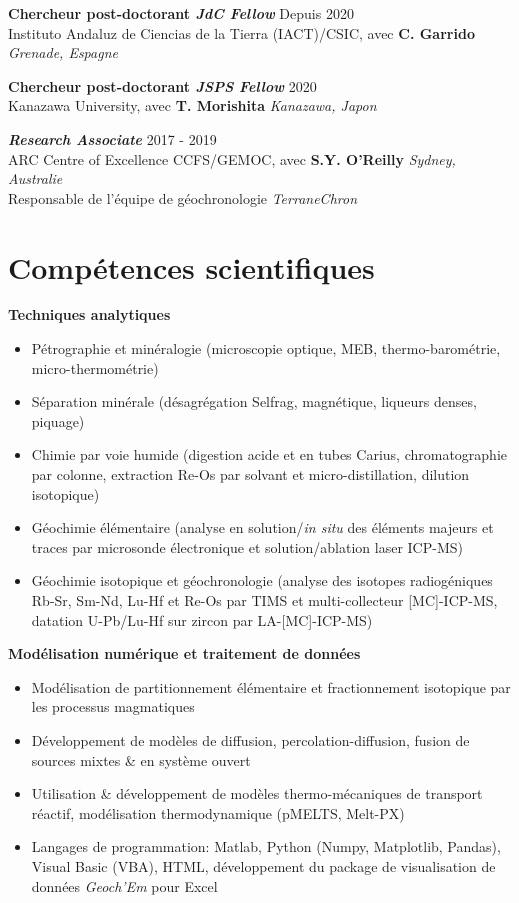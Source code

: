 \documentclass[a4paper,11pt]{article}
\begin{document}
    \textbf{Chercheur post-doctorant \textit{JdC Fellow}}
    \hfill {Depuis 2020}\\
    Instituto Andaluz de Ciencias de la Tierra (IACT)/CSIC, avec \textbf{C. Garrido}
    \hfill \textit{Grenade, Espagne}
     
    \textbf{Chercheur post-doctorant \textit{JSPS Fellow}}
    \hfill {2020}\\
    Kanazawa University, avec \textbf{T. Morishita}
    \hfill \textit{Kanazawa, Japon}
    
    \textbf{\textit{Research Associate}}
    \hfill {2017 - 2019}\\
    ARC Centre of Excellence CCFS/GEMOC, avec \textbf{S.Y. O'Reilly}
    \hfill \textit{Sydney, Australie}\\
    Responsable de l’équipe de géochronologie \textit{TerraneChron}
    
\section{Compétences scientifiques}

    \textbf{Techniques analytiques} 
    \begin{itemize}[itemsep=0pt,parsep=2pt]
        \item Pétrographie et minéralogie (microscopie optique, MEB, thermo-barométrie, micro-thermométrie)
        \item Séparation minérale (désagrégation Selfrag, magnétique, liqueurs denses, piquage)
        \item Chimie par voie humide (digestion acide et en tubes Carius, chromatographie par colonne, extraction Re-Os par solvant et micro-distillation, dilution isotopique)
        \item Géochimie élémentaire (analyse en solution/\textit{in situ} des éléments majeurs et traces par microsonde électronique et solution/ablation laser ICP-MS)
        \item Géochimie isotopique et géochronologie (analyse des isotopes radiogéniques Rb-Sr, Sm-Nd, Lu-Hf et Re-Os par TIMS et multi-collecteur [MC]-ICP-MS, datation U-Pb/Lu-Hf sur zircon par LA-[MC]-ICP-MS)
    \end{itemize}
    
    \textbf{Modélisation numérique et traitement de données}
    \begin{itemize}[itemsep=0pt,parsep=2pt]
        \item Modélisation de partitionnement élémentaire et fractionnement isotopique par les processus magmatiques
        \item Développement de modèles de diffusion, percolation-diffusion, fusion de sources mixtes \& en système ouvert
        \item Utilisation \& développement de modèles thermo-mécaniques de transport réactif, modélisation thermodynamique (pMELTS, Melt-PX)
        \item Langages de programmation: Matlab, Python (Numpy, Matplotlib, Pandas), Visual Basic (VBA), HTML, développement du package de visualisation de données \textit{Geoch’Em} pour Excel
    \end{itemize}
    
\end{document}
